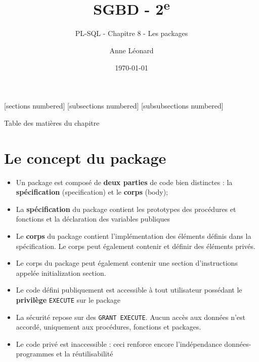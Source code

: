 \documentclass[10pt]{beamer}
\title{SGBD - 2\textsuperscript{e}}
\subtitle{PL-SQL - Chapitre 8 - Les packages}
\date{\today}
\author{Anne Léonard}
\institute{Haute École de la Province de Liège}
\begin{document}
\maketitle

[sections numbered]
[subsections numbered]
[subsubsections numbered]
\begin{frame}[allowframebreaks]{Table des matières du chapitre}
    \tableofcontents[subsectionstyle=show/show/hide,subsubsectionstyle=show/show/hide,]
\end{frame}

\section{Le concept du package}

\begin{frame}{\secname}
    \begin{itemize}
        \item Un package est composé de \textbf{deux parties} de code bien distinctes : la \textbf{spécification} (specification) et le \textbf{corps} (body);
        \item La \textbf{spécification} du package contient les prototypes des procédures et fonctions et la déclaration des variables publiques
        \item Le \textbf{corps} du package contient l'implémentation des éléments définis dans la spécification.  Le corps peut également contenir et définir des éléments privés.
        \item Le corps du package peut également contenir une section d'instructions appelée initialization section.
    \end{itemize}
\end{frame}

\begin{frame}{\secname}
    \begin{itemize}
        \item Le code défini publiquement est accessible à tout utilisateur possédant le \textbf{privilège} \lstinline[language=plsql]!EXECUTE! sur le package
        \item La sécurité repose sur des \lstinline[language=plsql]!GRANT EXECUTE!. Aucun accès aux données n'est accordé, uniquement aux procédures, fonctions et packages.
        \item Le code privé est inaccessible : ceci renforce encore l'indépendance données-programmes et la réutilisabilité
    \end{itemize}
\end{frame}
\end{document}

